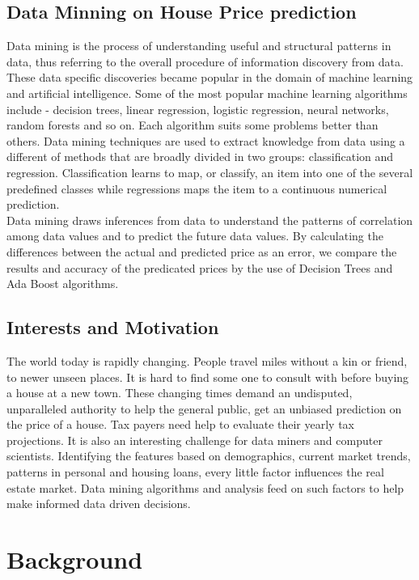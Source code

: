 \documentclass[fleqn,10pt]{SelfArx} %
\begin{document}
	\subsection{Data Minning on House Price prediction}
	Data mining is the process of understanding useful and structural patterns in data, thus referring to the overall procedure of information discovery from data. These data specific discoveries became popular in the domain of machine learning and artificial intelligence. Some of the most popular machine learning algorithms include - decision trees, linear regression, logistic regression, neural networks, random forests and so on. Each algorithm suits some problems better than others. Data mining techniques are used to extract knowledge from data using a different of methods that are broadly divided in two groups: classification and regression. Classification learns to map, or classify, an item into one of the several predefined classes while regressions maps the item to a continuous numerical prediction.\\
	
	Data mining draws inferences from data to understand the patterns of correlation among data values and to predict the future data values. By calculating the differences between the actual and predicted price as an error, we compare the results and accuracy of the predicated prices by the use of Decision Trees and Ada Boost algorithms. 
	
	\subsection{Interests and Motivation}
	The world today is rapidly changing. People travel miles without a kin or friend, to newer unseen places. It is hard to find some one to consult with before buying a house at a new town. These changing times demand an undisputed, unparalleled authority to help the general public, get an unbiased prediction on the price of a house. Tax payers need help to evaluate their yearly tax projections. It is also an interesting challenge for data miners and computer scientists. Identifying the features based on demographics, current market trends, patterns in personal and housing loans, every little factor influences the real estate market. Data mining algorithms and analysis feed on such factors to help make informed data driven decisions. 

	
	
	\section{Background}
	
\end{document}
